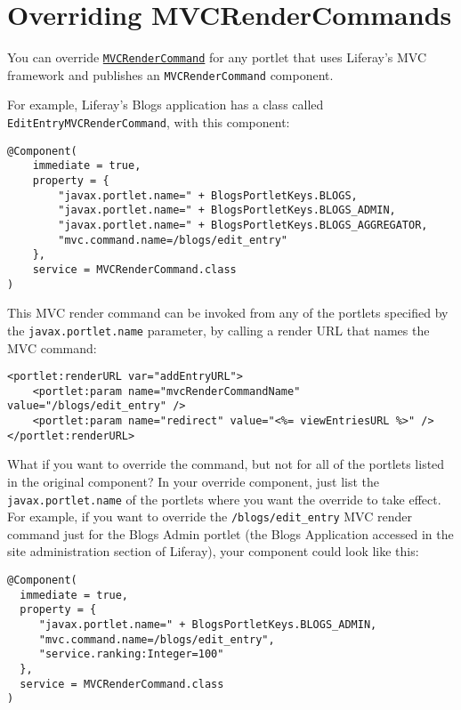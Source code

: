\chapter{Overriding
MVCRenderCommands}\label{overriding-mvcrendercommands}

You can override
\href{https://docs.liferay.com/dxp/portal/7.2-latest/javadocs/portal-kernel/com/liferay/portal/kernel/portlet/bridges/mvc/MVCRenderCommand.html}{\texttt{MVCRenderCommand}}
for any portlet that uses Liferay's MVC framework and publishes an
\texttt{MVCRenderCommand} component.

For example, Liferay's Blogs application has a class called
\texttt{EditEntryMVCRenderCommand}, with this component:

\begin{verbatim}
@Component(
    immediate = true,
    property = {
        "javax.portlet.name=" + BlogsPortletKeys.BLOGS,
        "javax.portlet.name=" + BlogsPortletKeys.BLOGS_ADMIN,
        "javax.portlet.name=" + BlogsPortletKeys.BLOGS_AGGREGATOR,
        "mvc.command.name=/blogs/edit_entry"
    },
    service = MVCRenderCommand.class
)
\end{verbatim}

This MVC render command can be invoked from any of the portlets
specified by the \texttt{javax.portlet.name} parameter, by calling a
render URL that names the MVC command:

\begin{verbatim}
<portlet:renderURL var="addEntryURL">
    <portlet:param name="mvcRenderCommandName" value="/blogs/edit_entry" />
    <portlet:param name="redirect" value="<%= viewEntriesURL %>" />
</portlet:renderURL>
\end{verbatim}

What if you want to override the command, but not for all of the
portlets listed in the original component? In your override component,
just list the \texttt{javax.portlet.name} of the portlets where you want
the override to take effect. For example, if you want to override the
\texttt{/blogs/edit\_entry} MVC render command just for the Blogs Admin
portlet (the Blogs Application accessed in the site administration
section of Liferay), your component could look like this:

\begin{verbatim}
@Component(
  immediate = true,
  property = {
     "javax.portlet.name=" + BlogsPortletKeys.BLOGS_ADMIN,
     "mvc.command.name=/blogs/edit_entry",
     "service.ranking:Integer=100"
  },
  service = MVCRenderCommand.class
)
\end{verbatim}

